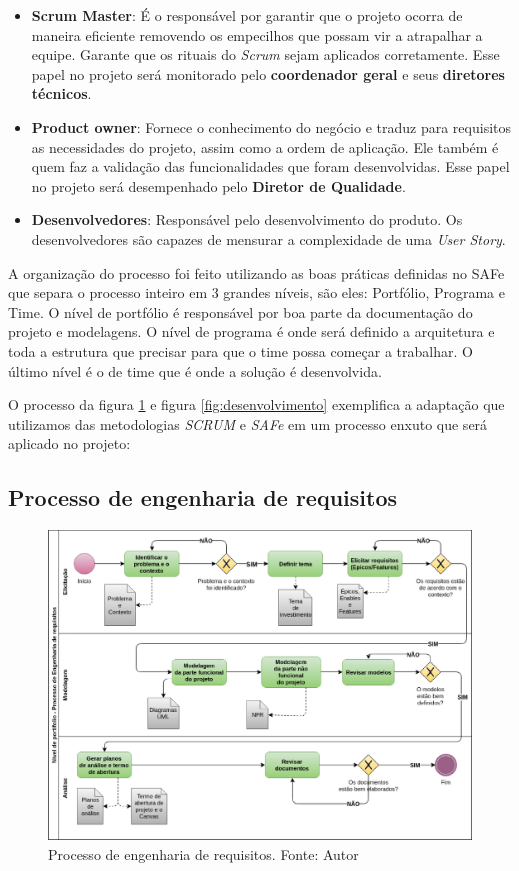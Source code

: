 \begin{itemize}
    \item \textbf{Scrum Master}: É o responsável por garantir que o projeto ocorra de maneira eficiente removendo os empecilhos que possam vir a atrapalhar a equipe. Garante que os rituais do \textit{Scrum} sejam aplicados corretamente. Esse papel no projeto será monitorado pelo \textbf{coordenador geral} e seus \textbf{diretores técnicos}.
    \item \textbf{Product owner}: Fornece o conhecimento do negócio e traduz para requisitos as necessidades do projeto, assim como a ordem de aplicação. Ele também é quem faz a validação das funcionalidades que foram desenvolvidas. Esse papel no projeto será desempenhado pelo \textbf{Diretor de Qualidade}.
    \item \textbf{Desenvolvedores}: Responsável pelo desenvolvimento do produto. Os desenvolvedores são capazes de mensurar a complexidade de uma \textit{User Story}.
\end{itemize}

A organização do processo foi feito utilizando as boas práticas definidas no SAFe que separa o processo inteiro em 3 grandes níveis, são eles: Portfólio, Programa e Time. O nível de portfólio é responsável por boa parte da documentação do projeto e modelagens. O nível de programa é onde será definido a arquitetura e toda a estrutura que precisar para que o time possa começar a trabalhar. O último nível é o de time que é onde a solução é desenvolvida.

O processo da figura \ref{fig:requisitos} e figura \ref{fig:desenvolvimento} exemplifica a adaptação que utilizamos das metodologias \textit{SCRUM} e \textit{SAFe} em um processo enxuto que será aplicado no projeto:

\subsection{Processo de engenharia de requisitos}

\begin{figure}[ht]
	\centering
    \includegraphics[keepaspectratio=true,scale=0.5]{figuras/requisitos.eps}
    \caption[Processo de engenharia de requisitos.]{Processo de engenharia de requisitos. Fonte: Autor}
	\label{fig:requisitos}
\end{figure}

